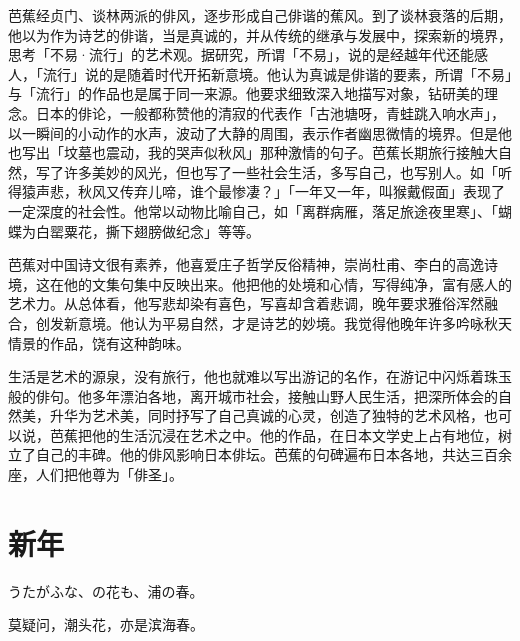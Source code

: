 {    芭蕉经贞门\footnotemark[1]、谈林\footnotemark[2]两派的俳风，逐步形成自己俳谐的蕉风。到了谈林衰落的后期，他以为作为诗艺的俳谐，当是真诚的，并从传统的继承与发展中，探索新的境界，思考「不易·流行」的艺术观。据研究，所谓「不易」，说的是经越年代还能感人，「流行」说的是随着时代开拓新意境。他认为真诚是俳谐的要素，所谓「不易」与「流行」的作品也是属于同一来源。他要求细致深入地描写对象，钻研美的理念。日本的俳论，一般都称赞他的清寂的代表作「古池塘呀，青蛙跳入响水声」，以一瞬间的小动作的水声，波动了大静的周围，表示作者幽思微情的境界。但是他也写出「坟墓也震动，我的哭声似秋风」那种激情的句子。芭蕉长期旅行接触大自然，写了许多美妙的风光，但也写了一些社会生活，多写自己，也写别人。如「听得猿声悲，秋风又传弃儿啼，谁个最惨凄？」「一年又一年，叫猴戴假面」表现了一定深度的社会性。他常以动物比喻自己，如「离群病雁，落足旅途夜里寒」、「蝴蝶为白罂粟花，撕下翅膀做纪念」等等。

    芭蕉对中国诗文很有素养，他喜爱庄子哲学反俗精神，崇尚杜甫、李白的高逸诗境，这在他的文集句集中反映出来。他把他的处境和心情，写得纯净，富有感人的艺术力。从总体看，他写悲却染有喜色，写喜却含着悲调，晚年要求雅俗浑然融合，创发新意境。他认为平易自然，才是诗艺的妙境。我觉得他晚年许多吟咏秋天情景的作品，饶有这种韵味。

    生活是艺术的源泉，没有旅行，他也就难以写出游记的名作，在游记中闪烁着珠玉般的俳句。他多年漂泊各地，离开城市社会，接触山野人民生活，把深所体会的自然美，升华为艺术美，同时抒写了自己真诚的心灵，创造了独特的艺术风格，也可以说，芭蕉把他的生活沉浸在艺术之中。他的作品，在日本文学史上占有地位，树立了自己的丰碑。他的俳风影响日本俳坛。芭蕉的句碑遍布日本各地，共达三百余座，人们把他尊为「俳圣」。


}

\newpage

\section{\FK 新年}

\setcounter{haikucounter}{0}

\begin{haiku}
    {\FH うたがふな、の花も、浦の春。}

    {\FK 莫疑问，潮头花，亦是滨海春。}
\end{haiku}

